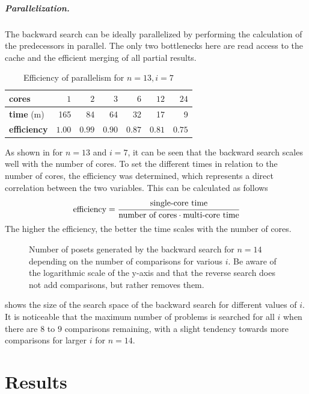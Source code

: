 \documentclass[a4paper,UKenglish,cleveref, autoref, thm-restate]{lipics-v2021}
\begin{document}
\subparagraph{Parallelization.} \label{sec:backward:parallelisation}
The backward search can be ideally parallelized by performing the calculation of the predecessors in parallel.
The only two bottlenecks here are read access to the cache and the efficient merging of all partial results.

\begin{table}[!t]
  \renewcommand{\arraystretch}{1.1}
  \caption{Efficiency of parallelism for $n = 13, i = 7$}
  \label{table:backward-parallel}
  \centering
  \small
  \begin{tabular}{l|rrrrrr}
    \textbf{cores}      & $1$    & $2$    & $3$    & $6$    & $12$   & $24$   \\ \hline
    \textbf{time} (m)   & 165    & 84     & 64     & 32     & 17     & 9      \\ \hline
    \textbf{efficiency} & $1.00$ & $0.99$ & $0.90$ & $0.87$ & $0.81$ & $0.75$
  \end{tabular}
\end{table}

As shown in  for $n = 13$ and $i = 7$, it can be seen that the backward search scales well with the number of cores.
To set the different times in relation to the number of cores, the efficiency was determined, which represents a direct correlation between the two variables.
This can be calculated as follows
\[
  \text{efficiency} = \cfrac{\text{single-core time}}{\text{number of cores} \cdot \text{multi-core time}}
\]
The higher the efficiency, the better the time scales with the number of cores.

\begin{figure}[!b]
  \centering
  
  \caption{Number of posets generated by the backward search for $n = 14$ depending on the number of comparisons for various $i$.
    Be aware of the logarithmic scale of the y-axis and that the reverse search does not add comparisons, but rather removes them.}
  \label{fig:backward-posets-per-level}
\end{figure}

 shows the size of the search space of the backward search for different values of $i$.
It is noticeable that the maximum number of problems is searched for all $i$ when there are $8$ to $9$ comparisons remaining, with a slight tendency towards more comparisons for larger $i$ for $n = 14$.

\section{Results}
\end{document}
